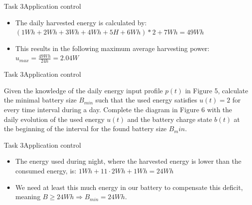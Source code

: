 \begin{frame}{Task 3}{Application control}
    \begin{solution}
        \begin{itemize}
            \item The daily harvested energy is calculated by: $(1Wh + 2Wh + 3Wh + 4Wh + 5H + 6Wh) * 2 + 7 Wh = 49Wh$
            \item This results in the following maximum average harvesting power: $u_{max} = \frac{49 Wh}{24h} = 2.04W$
        \end{itemize}
    \end{solution}
\end{frame}
\begin{frame}{Task 3}{Application control}
    \begin{tasknoinc}
        Given the knowledge of the daily energy input proﬁle $p(t)$ in Figure 5, calculate the minimal battery size $B_{min}$ such that the used energy satisﬁes $u(t) = 2$ for every time interval during a day. Complete the diagram in Figure 6 with the daily evolution of the used energy $u(t)$ and the battery charge state $b(t)$ at the beginning of the interval for the found battery size $B_min$.
    \end{tasknoinc}
\end{frame}
\begin{frame}{Task 3}{Application control}
    \begin{solutionnoinc}
        \begin{itemize}
            \item The energy used during night, where the harvested energy is \alert{lower} than the consumed energy, is: $1Wh + 11 \cdot 2Wh + 1Wh = 24Wh$
            \item We need at least this much energy in our battery to compensate this deficit, meaning $B \geq 24Wh \Rightarrow B_{min} = 24Wh$.
        \end{itemize}
    \end{solutionnoinc}
\end{frame}

